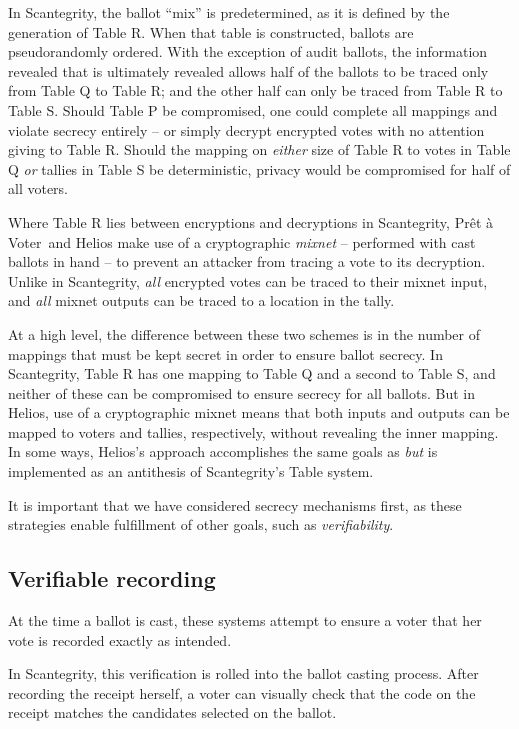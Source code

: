 \documentclass[10pt,twocolumn]{article}
\newcommand{\term}[1]{\textit{#1}}
\newcommand{\preta}{Pr\^{e}t \`{a}}
\newcommand{\pv}{\preta{} Voter}
\begin{document}
In Scantegrity, the ballot ``mix'' is predetermined, as it is defined by the generation of Table R.
When that table is constructed, ballots are pseudorandomly ordered. With the exception of audit
ballots, the information revealed that is ultimately revealed allows half of the ballots to be
traced only from Table Q to Table R; and the other half can only be traced from Table R to Table S.
Should Table P be compromised, one could complete all mappings and violate secrecy entirely -- or
simply decrypt encrypted votes with no attention giving to Table R. Should the mapping on
\emph{either} size of Table R to votes in Table Q \emph{or} tallies in Table S be deterministic,
privacy would be compromised for half of all voters.

Where Table R lies between encryptions and decryptions in Scantegrity, \pv\ and Helios make use of a
cryptographic \term{mixnet} -- performed with cast ballots in hand -- to prevent an attacker from
tracing a vote to its decryption. Unlike in Scantegrity, \emph{all} encrypted votes can be traced to
their mixnet input, and \emph{all} mixnet outputs can be traced to a location in the tally.

At a high level, the difference between these two schemes is in the number of mappings that must be
kept secret in order to ensure ballot secrecy. In Scantegrity, Table R has one mapping to Table Q
and a second to Table S, and neither of these can be compromised to ensure secrecy for all ballots.
But in Helios, use of a cryptographic mixnet means that both inputs and outputs can be mapped to
voters and tallies, respectively, without revealing the inner mapping. In some ways, Helios's
approach accomplishes the same goals as \emph{but} is implemented as an antithesis of Scantegrity's
Table system.

It is important that we have considered secrecy mechanisms first, as these strategies enable
fulfillment of other goals, such as \emph{verifiability}.

\subsection{Verifiable recording}

At the time a ballot is cast, these systems attempt to ensure a voter that her
vote is recorded exactly as intended.

In Scantegrity, this verification is rolled into the ballot casting process. After recording the
receipt herself, a voter can visually check that the code on the receipt matches the candidates
selected on the ballot.
\end{document}
